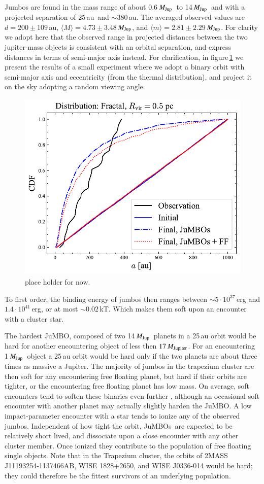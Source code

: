 \documentclass[aa]{lib/aa}
\newcommand{\MJup}{\mbox{${M}_{\rm Jup}$}}
\newcommand{\jumbo}{\mbox{JuMBO}}
\newcommand{\jumbos}{\mbox{JuMBOs}}
\begin{document}
Jumbos are found in the mass range of about 0.6\,\MJup\, to
14\,\MJup\, and with a projected separation of 25\,au\, and $\sim
380$\,au.  The averaged observed values are $d=200\pm109$\,au,
$\langle M\rangle = 4.73\pm3.48$\,\MJup, and $\langle m\rangle =
2.81\pm2.29$\,\MJup.  For clarity we adopt here that the observed
range in projected distances between the two jupiter-mass objects is
consistent with an orbital separation, and express distances in terms
of semi-major axis instead.
For clarification, in figure\,\ref{fig:projected_separation} we present the results of a
small experiment where we adopt a binary orbit with semi-major axis
and eccentricity (from the thermal distribution), and project it on
the sky adopting a random viewing angle.

\begin{figure}
    \centering
    \includegraphics[width=.4\columnwidth]{figures/projected_separation.pdf}
         \caption{place holder for now.}
         \label{fig:projected_separation}
\end{figure}

To first order, the binding energy of jumbos then ranges between $\sim
5\cdot 10^{37}$\,erg and $1.4\cdot 10^{41}$\,erg, or at most $\sim
0.02$\,kT. Which makes them soft upon an encounter with a cluster
star.

The hardest \jumbo, composed of two 14\,\MJup\, planets in a 25\,au
orbit would be hard for another encountering object of less then
$17\,M_{\rm Jupiter}$.  For an encountering 1\,\MJup\, object a 25\,au
orbit would be hard only if the two planets are about three times as
massive a Jupiter.  The majority of jumbos in the trapezium cluster
are then soft for any encountering free floating planet, but hard if
their orbits are tighter, or the encountering free floating planet has
low mass.  On average, soft encounters tend to soften these binaries
even further \citep{1975MNRAS.173..729H}, although an occasional soft
encounter with another planet may actually slightly harden the \jumbo.
A low impact-parameter encounter with a star tends to ionize any of
the observed jumbos.  Independent of how tight the orbit, \jumbos\,
are expected to be relatively short lived, and dissociate upon a close
encounter with any other cluster member.  Once ionized they contribute
to the population of free floating single objects.  Note that in the
Trapezium cluster, the orbits of 2MASS J11193254-1137466AB, WISE
1828+2650, and WISE J0336-014 would be hard; they could therefore be
the fittest survivors of an underlying population.
\end{document}
